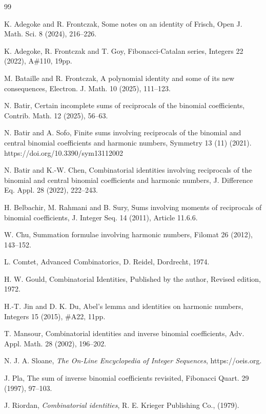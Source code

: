 \documentclass[11pt,reqno]{amsart}
\theoremstyle{plain}
\numberwithin{equation}{section}
\begin{document}
\begin{thebibliography}{99}

K. Adegoke and R. Frontczak, Some notes on an identity of Frisch, Open J. Math. Sci. 8 (2024), 216–226.

K. Adegoke, R. Frontczak and T. Goy, Fibonacci-Catalan series, Integers 22 (2022), A\#110, 19pp.

M. Bataille and R. Frontczak, A polynomial identity and some of its new consequences, Electron. J. Math. 10 (2025), 111--123.

N. Batir, Certain incomplete sums of reciprocals of the binomial coefficients, Contrib. Math. 12 (2025), 56--63.

N. Batir and A. Sofo, Finite sums involving reciprocals of the binomial and central binomial coefficients and harmonic numbers,
Symmetry 13 (11) (2021).  https://doi.org/10.3390/sym13112002 

N. Batir and K.-W. Chen, Combinatorial identities involving reciprocals of the binomial and central binomial coefficients and harmonic numbers, J. Difference Eq. Appl. 28 (2022), 222--243.

H. Belbachir, M. Rahmani and B. Sury, Sums involving moments of reciprocals of binomial coefficients, 
J. Integer Seq. 14 (2011), Article 11.6.6.

W. Chu, Summation formulae involving harmonic numbers, Filomat 26 (2012), 143--152.

L. Comtet, Advanced Combinatorics, D. Reidel, Dordrecht, 1974.

H. W. Gould, Combinatorial Identities, Published by the author, Revised edition, 1972.

H.-T. Jin and D. K. Du, Abel's lemma and identities on harmonic numbers, Integers 15 (2015), \#A22, 11pp.

T. Mansour, Combinatorial identities and inverse binomial coefficients, Adv. Appl. Math. 28 (2002), 196--202.

N. J. A. Sloane, \emph{The On-Line Encyclopedia of Integer Sequences}, https://oeis.org.

J. Pla, The sum of inverse binomial coefficients revisited, Fibonacci Quart. 29 (1997), 97--103.

J. Riordan, \emph{Combinatorial identities}, R. E. Krieger Publishing Co., (1979).


\end{thebibliography}
\end{document}
